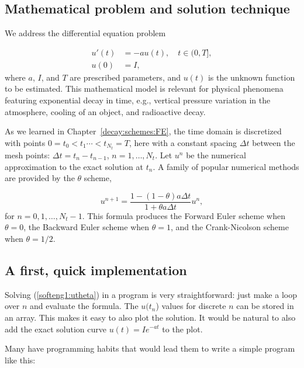 \documentclass[graybox,sectrefs,envcountresetchap,open=right,final]{svmonodo}
\begin{document}
\subsection{Mathematical problem and solution technique}
\label{softeng1:basic:math}

We address the differential equation problem

\begin{align}
u'(t) &= -au(t), \quad t \in (0,T], \label{softeng1:ode}\\ 
u(0)  &= I,                         \label{softeng1:u0}
\end{align}
where $a$, $I$, and $T$ are prescribed parameters, and $u(t)$ is
the unknown function to be estimated. This mathematical model
is relevant for physical phenomena featuring exponential decay
in time, e.g., vertical pressure variation in the atmosphere,
cooling of an object, and radioactive decay.

As we learned in Chapter~\ref{decay:schemes:FE}, the
time domain is discretized with points $0 = t_0 < t_1 \cdots < t_{N_t}=T$,
here with a constant spacing $\Delta t$ between the
mesh points: $\Delta t = t_{n}-t_{n-1}$, $n=1,\ldots,N_t$. Let
$u^n$ be the numerical approximation to the exact solution at $t_n$.
A family of popular numerical methods are provided by the $\theta$ scheme,

\begin{equation}
u^{n+1} = \frac{1 - (1-\theta) a\Delta t}{1 + \theta a\Delta t}u^n,
\label{softeng1:utheta}
\end{equation}
for $n=0,1,\ldots,N_t-1$. This formula produces
the Forward Euler
scheme when $\theta=0$,
the Backward Euler
scheme when $\theta=1$,
and the Crank-Nicolson
scheme when $\theta=1/2$.


\subsection{A first, quick implementation}
\label{softeng1:basic:impl1}

Solving (\ref{softeng1:utheta}) in a program is very straightforward:
just make a loop over $n$ and evaluate the formula. The $u(t_n$)
values for discrete $n$ can be stored in an array. This makes it easy
to also plot the solution. It would be natural to also add
the exact
solution curve $u(t)=Ie^{-at}$ to the plot.

Many have programming habits that would lead them
to write a simple program like this:
\end{document}
